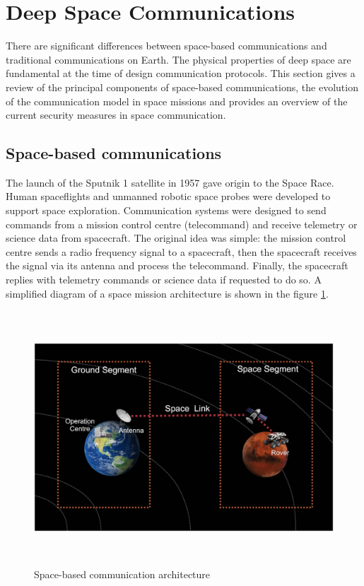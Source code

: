 \section{Deep Space Communications}
\label{sec:space}

There are significant differences between space-based communications and traditional communications on Earth. The physical properties of deep space are fundamental at the time of design communication protocols. This section gives a review of the principal components of space-based communications, the evolution of the communication model in space missions and provides an overview of the current security measures in space communication. 


\subsection{Space-based communications}

The launch of the Sputnik 1 satellite in 1957 gave origin to the Space Race. Human spaceflights and unmanned robotic space probes were developed to support space exploration. Communication systems were designed to send commands from a mission control centre (telecommand) and receive telemetry or science data from spacecraft. The original idea was simple: the mission control centre sends a radio frequency signal to a spacecraft, then the spacecraft receives the signal via its antenna and process the telecommand. Finally, the spacecraft replies with telemetry commands or science data if requested to do so. A simplified diagram of a space mission architecture is shown in the figure \ref{fig:space-based-arc}.  



\begin{figure}[ht]
\centering
\includegraphics[width=1 \linewidth, height=9.5cm]{images/ground.png} 
\caption{Space-based communication architecture}
\label{fig:space-based-arc}
\end{figure}

